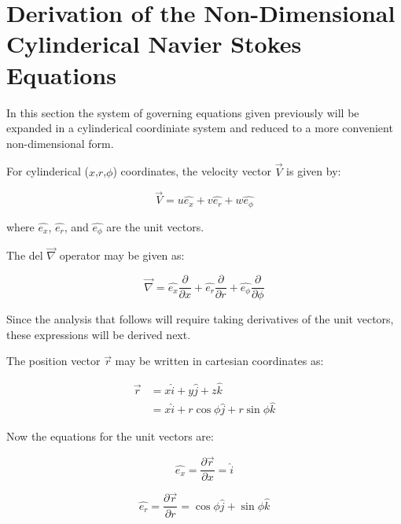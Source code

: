\section{Derivation of the Non-Dimensional Cylinderical Navier Stokes Equations}

In this section the system of governing equations given previously will be
expanded in a cylinderical coordiniate system and reduced to a more convenient
non-dimensional form.

For cylinderical ($x$,$r$,$\phi$) coordinates, the velocity vector
$\overrightarrow{V}$ is given by:

\begin{equation}
\overrightarrow{V} = u \hat{e_x} + v \hat{e_r} + w \hat{e_\phi}
\end{equation}

where $\hat{e_x}$, $\hat{e_r}$, and $\hat{e_\phi}$ are the unit vectors.

The del $\overrightarrow{\nabla}$ operator may be given as:

\begin{equation}
  \overrightarrow{\nabla} =  
      \hat{e_x}\frac{\partial}{\partial x} 
    + \hat{e_r}\frac{\partial}{\partial r} 
    + \hat{e_\phi}\frac{\partial}{\partial\phi}
\end{equation}

Since the analysis that follows will require taking derivatives of the unit
vectors, these expressions will be derived next.

The position vector $\overrightarrow{r}$ may be written in cartesian coordinates as:

\begin{equation}
  \begin{aligned}
    \overrightarrow{r} &= x\hat{i} + y\hat{j} + z\hat{k} \\
        &= x\hat{i} + r\cos\phi\hat{j} + r\sin\phi\hat{k}
  \end{aligned}
\end{equation}

Now the equations for the unit vectors are:

\begin{equation}
  \hat{e_x} = 
  \frac{\partial\overrightarrow{r}}{\partial x} = \hat{i}
\end{equation}

\begin{equation}
  \hat{e_r} 
  = \frac{\partial\overrightarrow{r}}{\partial{r}} 
  = \cos{\phi}\hat{j} + \sin{\phi}\hat{k}
\end{equation}

